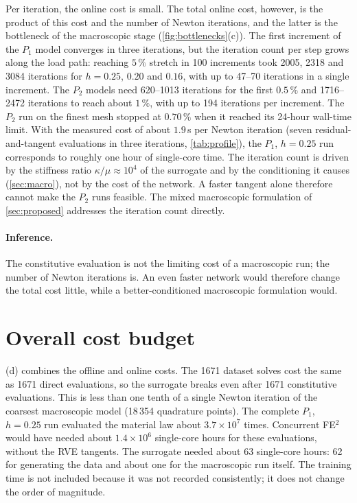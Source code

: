 Per iteration, the online cost is small. The total online cost, however, is the
product of this cost and the number of Newton iterations, and the latter is the
bottleneck of the macroscopic stage (\cref{fig:bottlenecks}(c)). The first
increment of the $P_1$ model converges in three iterations, but the iteration count
per step grows along the load path: reaching $5\,\%$ stretch in 100 increments
took 2005, 2318 and 3084 iterations for $h=0.25$, $0.20$ and $0.16$, with up to
47--70 iterations in a single increment. The $P_2$ models need 620--1013
iterations for the first $0.5\,\%$ and 1716--2472 iterations to reach about
$1\,\%$, with up to 194 iterations per increment. The $P_2$ run on the finest mesh
stopped at $0.70\,\%$ when it reached its 24-hour wall-time limit. With the measured
cost of about $1.9\,$s per Newton iteration (seven residual-and-tangent evaluations
in three iterations, \cref{tab:profile}), the $P_1$, $h=0.25$ run corresponds to
roughly one hour of single-core time. The iteration count is driven by
the stiffness ratio $\kappa/\mu\approx10^4$ of the surrogate and by the
conditioning it causes (\cref{sec:macro}), not by the cost of the network. A
faster tangent alone therefore cannot make the $P_2$ runs feasible. The mixed
macroscopic formulation of \cref{sec:proposed} addresses the iteration count
directly.

\paragraph{Inference.} The constitutive evaluation is not the limiting cost of a macroscopic run; the number
of Newton iterations is. An even faster network would therefore change the total cost little, while a
better-conditioned macroscopic formulation would.

\section{Overall cost budget}

(d) combines the offline and online costs. The 1671 dataset
solves cost the same as 1671 direct evaluations, so the surrogate breaks even
after 1671 constitutive evaluations. This is less than one tenth of a single
Newton iteration of the coarsest macroscopic model (18\,354 quadrature points).
The complete $P_1$, $h=0.25$ run evaluated the material law about
$3.7\times10^7$ times. Concurrent FE$^2$ would have needed about $1.4\times10^6$
single-core hours for these evaluations, without the RVE tangents. The surrogate
needed about 63 single-core hours: 62 for generating the data and about one for
the macroscopic run itself.
The training time is not included because it was not recorded consistently;
it does not change the order of magnitude.

